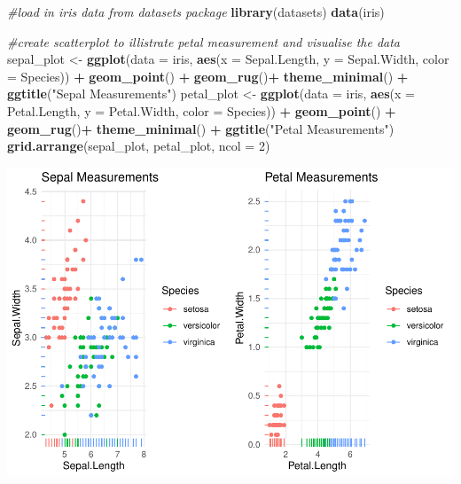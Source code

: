 \documentclass[
]{article}
\newenvironment{Shaded}{\begin{snugshade}}{\end{snugshade}}
\newcommand{\CommentTok}[1]{\textcolor[rgb]{0.56,0.35,0.01}{\textit{#1}}}
\newcommand{\DataTypeTok}[1]{\textcolor[rgb]{0.13,0.29,0.53}{#1}}
\newcommand{\DecValTok}[1]{\textcolor[rgb]{0.00,0.00,0.81}{#1}}
\newcommand{\KeywordTok}[1]{\textcolor[rgb]{0.13,0.29,0.53}{\textbf{#1}}}
\newcommand{\NormalTok}[1]{#1}
\newcommand{\OperatorTok}[1]{\textcolor[rgb]{0.81,0.36,0.00}{\textbf{#1}}}
\newcommand{\StringTok}[1]{\textcolor[rgb]{0.31,0.60,0.02}{#1}}
\begin{document}
\begin{Shaded}
\begin{Highlighting}[]
\CommentTok{#load in iris data from datasets package}
\KeywordTok{library}\NormalTok{(datasets)}
\KeywordTok{data}\NormalTok{(iris)}

\CommentTok{#create scatterplot to illistrate petal measurement and visualise the data }
\NormalTok{sepal_plot <-}\StringTok{ }\KeywordTok{ggplot}\NormalTok{(}\DataTypeTok{data =}\NormalTok{ iris, }\KeywordTok{aes}\NormalTok{(}\DataTypeTok{x =}\NormalTok{ Sepal.Length, }\DataTypeTok{y =}\NormalTok{ Sepal.Width, }\DataTypeTok{color =}\NormalTok{ Species)) }\OperatorTok{+}\StringTok{ }
\StringTok{    }\KeywordTok{geom_point}\NormalTok{() }\OperatorTok{+}\StringTok{ }\KeywordTok{geom_rug}\NormalTok{()}\OperatorTok{+}\StringTok{ }\KeywordTok{theme_minimal}\NormalTok{() }\OperatorTok{+}\StringTok{ }\KeywordTok{ggtitle}\NormalTok{(}\StringTok{"Sepal Measurements"}\NormalTok{)}
\NormalTok{petal_plot <-}\StringTok{ }\KeywordTok{ggplot}\NormalTok{(}\DataTypeTok{data =}\NormalTok{ iris, }\KeywordTok{aes}\NormalTok{(}\DataTypeTok{x =}\NormalTok{ Petal.Length, }\DataTypeTok{y =}\NormalTok{ Petal.Width, }\DataTypeTok{color =}\NormalTok{ Species)) }\OperatorTok{+}\StringTok{ }
\StringTok{    }\KeywordTok{geom_point}\NormalTok{() }\OperatorTok{+}\StringTok{ }\KeywordTok{geom_rug}\NormalTok{()}\OperatorTok{+}\StringTok{ }\KeywordTok{theme_minimal}\NormalTok{() }\OperatorTok{+}\StringTok{ }\KeywordTok{ggtitle}\NormalTok{(}\StringTok{"Petal Measurements"}\NormalTok{)}
\KeywordTok{grid.arrange}\NormalTok{(sepal_plot, petal_plot, }\DataTypeTok{ncol =} \DecValTok{2}\NormalTok{)}
\end{Highlighting}
\end{Shaded}

\includegraphics{assessment-1_files/figure-latex/unnamed-chunk-1-1.pdf}
\end{document}
